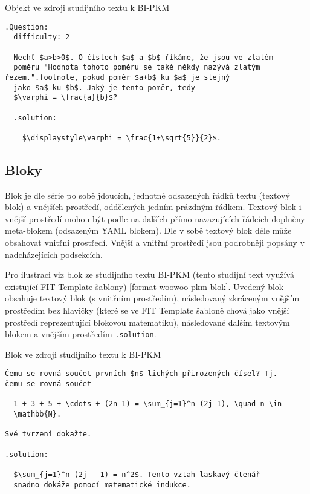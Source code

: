 \begin{listing}
    \caption{Objekt ve zdroji studijního textu k BI-PKM \cite{pkm}}
    \label{format-woowoo-pkm-otazka}
    \begin{verbatim}
.Question:
  difficulty: 2

  Nechť $a>b>0$. O číslech $a$ a $b$ říkáme, že jsou ve zlatém
  poměru "Hodnota tohoto poměru se také někdy nazývá zlatým řezem.".footnote, pokud poměr $a+b$ ku $a$ je stejný
  jako $a$ ku $b$. Jaký je tento poměr, tedy
  $\varphi = \frac{a}{b}$?

  .solution:

    $\displaystyle\varphi = \frac{1+\sqrt{5}}{2}$.
    \end{verbatim}
\end{listing}

\subsection{Bloky}

Blok je dle \cite{woowoo} série po sobě jdoucích, jednotně odsazených řádků textu (textový blok) a vnějších prostředí,
oddělených jedním prázdným řádkem. Textový blok i vnější prostředí mohou být podle \cite{woowoo} na dalších přímo
navazujících řádcích doplněny meta-blokem (odsazeným YAML blokem). Dle \cite{woowoo} v sobě textový blok déle může
obsahovat vnitřní prostředí. Vnější a vnitřní prostředí jsou podrobněji popsány v nadcházejících podsekcích.

Pro ilustraci viz blok ze studijního textu BI-PKM (tento studijní text využívá existující FIT Template šablony)
\ref{format-woowoo-pkm-blok}. Uvedený blok obsahuje textový blok (s vnitřním prostředím), následovaný zkráceným vnějším
prostředím bez hlavičky (které se ve FIT Template šabloně chová jako vnější prostředí reprezentující blokovou
matematiku), následované dalším textovým blokem a vnějším prostředím \texttt{.solution}.

\begin{listing}
    \caption{Blok ve zdroji studijního textu k BI-PKM \cite{pkm}}
    \label{format-woowoo-pkm-blok}
    \begin{verbatim}
Čemu se rovná součet prvních $n$ lichých přirozených čísel? Tj.
čemu se rovná součet

  1 + 3 + 5 + \cdots + (2n-1) = \sum_{j=1}^n (2j-1), \quad n \in
  \mathbb{N}.

Své tvrzení dokažte.

.solution:

  $\sum_{j=1}^n (2j - 1) = n^2$. Tento vztah laskavý čtenář
  snadno dokáže pomocí matematické indukce.
    \end{verbatim}
\end{listing}


